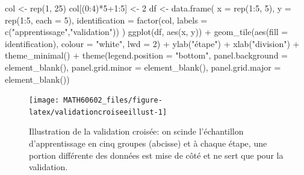 \documentclass[
  11pt,
  letterpaper,
]{book}
\newenvironment{Shaded}{\begin{snugshade}}{\end{snugshade}}
\newcommand{\AttributeTok}[1]{\textcolor[rgb]{0.77,0.63,0.00}{#1}}
\newcommand{\DecValTok}[1]{\textcolor[rgb]{0.00,0.00,0.81}{#1}}
\newcommand{\FunctionTok}[1]{\textcolor[rgb]{0.00,0.00,0.00}{#1}}
\newcommand{\NormalTok}[1]{#1}
\newcommand{\OtherTok}[1]{\textcolor[rgb]{0.56,0.35,0.01}{#1}}
\newcommand{\SpecialCharTok}[1]{\textcolor[rgb]{0.00,0.00,0.00}{#1}}
\newcommand{\StringTok}[1]{\textcolor[rgb]{0.31,0.60,0.02}{#1}}
\theoremstyle{definition}
\theoremstyle{definition}
\theoremstyle{definition}
\theoremstyle{remark}
\begin{document}
\begin{Shaded}
\begin{Highlighting}[]

\NormalTok{col }\OtherTok{\textless{}{-}} \FunctionTok{rep}\NormalTok{(}\DecValTok{1}\NormalTok{, }\DecValTok{25}\NormalTok{)}
\NormalTok{col[(}\DecValTok{0}\SpecialCharTok{:}\DecValTok{4}\NormalTok{)}\SpecialCharTok{*}\DecValTok{5}\SpecialCharTok{+}\DecValTok{1}\SpecialCharTok{:}\DecValTok{5}\NormalTok{] }\OtherTok{\textless{}{-}} \DecValTok{2}
\NormalTok{df }\OtherTok{\textless{}{-}} \FunctionTok{data.frame}\NormalTok{(}
  \AttributeTok{x =} \FunctionTok{rep}\NormalTok{(}\DecValTok{1}\SpecialCharTok{:}\DecValTok{5}\NormalTok{, }\DecValTok{5}\NormalTok{),}
  \AttributeTok{y =} \FunctionTok{rep}\NormalTok{(}\DecValTok{1}\SpecialCharTok{:}\DecValTok{5}\NormalTok{, }\AttributeTok{each =} \DecValTok{5}\NormalTok{),}
  \AttributeTok{identification =} \FunctionTok{factor}\NormalTok{(col, }\AttributeTok{labels =} \FunctionTok{c}\NormalTok{(}\StringTok{"apprentissage"}\NormalTok{,}\StringTok{"validation"}\NormalTok{))}
\NormalTok{)}
\FunctionTok{ggplot}\NormalTok{(df, }\FunctionTok{aes}\NormalTok{(x, y)) }\SpecialCharTok{+}
  \FunctionTok{geom\_tile}\NormalTok{(}\FunctionTok{aes}\NormalTok{(}\AttributeTok{fill =}\NormalTok{ identification), }\AttributeTok{colour =} \StringTok{"white"}\NormalTok{, }\AttributeTok{lwd =} \DecValTok{2}\NormalTok{) }\SpecialCharTok{+} 
  \FunctionTok{ylab}\NormalTok{(}\StringTok{"étape"}\NormalTok{) }\SpecialCharTok{+} 
  \FunctionTok{xlab}\NormalTok{(}\StringTok{"division"}\NormalTok{) }\SpecialCharTok{+} 
  \FunctionTok{theme\_minimal}\NormalTok{() }\SpecialCharTok{+} 
  \FunctionTok{theme}\NormalTok{(}\AttributeTok{legend.position =} \StringTok{"bottom"}\NormalTok{,}
        \AttributeTok{panel.background =} \FunctionTok{element\_blank}\NormalTok{(),}
        \AttributeTok{panel.grid.minor =} \FunctionTok{element\_blank}\NormalTok{(),}
        \AttributeTok{panel.grid.major =} \FunctionTok{element\_blank}\NormalTok{())}
\end{Highlighting}
\end{Shaded}

\begin{figure}

{\centering \texttt{[image: MATH60602\_files/figure-latex/validationcroiseeillust-1]} 

}

\caption{Illustration de la validation croisée: on scinde l'échantillon d'apprentissage en cinq groupes (abcisse) et à chaque étape, une portion différente des données est mise de côté et ne sert que pour la validation.}\label{fig:validationcroiseeillust}
\end{figure}
\end{document}
